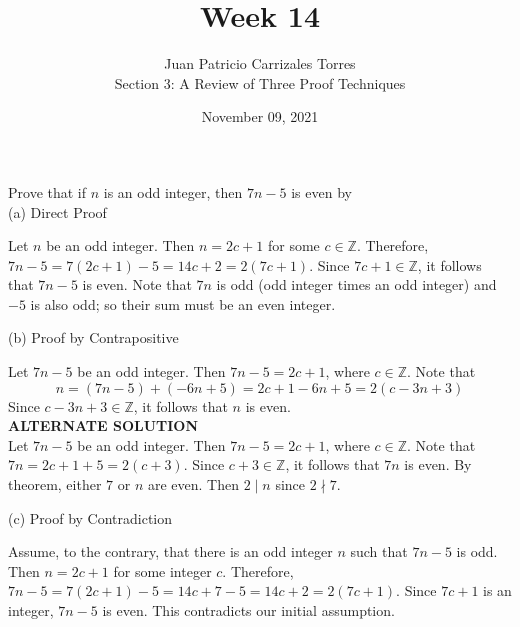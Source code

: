 \documentclass[12pt]{article}
\newcommand{\Z}{\mathbb{Z}}
\newenvironment{problem}[2][Problem]{\begin{trivlist}
		\item[\hskip \labelsep {\bfseries #1}\hskip \labelsep {\bfseries #2.}]}{\end{trivlist}}
\newenvironment{solution}[2][Solution]{\begin{trivlist}
		\item[\hskip \labelsep {\bfseries #1}\hskip \labelsep {\bfseries #2.}]}{\end{trivlist}}
\begin{document}
	
	\title{Week 14}
	\author{Juan Patricio Carrizales Torres \\
		Section 3: A Review of Three Proof Techniques}
	\date{November 09, 2021}
	\maketitle

	\begin{problem}{34}
		Prove that if $n$ is an odd integer, then $7n-5$ is even by\\
		
		(a) Direct Proof
		\begin{solution}{a}
			Let $n$ be an odd integer. Then $n=2c+1$ for some $c\in \Z$. Therefore, $7n -5 = 7(2c+1)-5 = 14c+2 = 2(7c+1)$. Since $7c+1 \in \Z$, it follows that $7n-5$ is even. Note that $7n$ is odd (odd integer times an odd integer) and $-5$ is also odd; so their sum must be an even integer.
		\end{solution}
	
		(b) Proof by Contrapositive
		\begin{solution}{b}
			Let $7n-5$ be an odd integer. Then $7n-5 = 2c +1$, where $c\in \Z$. Note that
			\begin{equation*}
				n = (7n-5) + (-6n+5) = 2c+1-6n+5 = 2(c-3n+3)
			\end{equation*}
		Since $c-3n+3 \in \Z$, it follows that $n$ is even.\\
		
		\textbf{ALTERNATE SOLUTION}\\
		
		Let $7n-5$ be an odd integer. Then $7n-5 = 2c+1$, where $c\in \Z$. Note that $7n = 2c+1+5 = 2(c+3)$. Since $c+3\in \Z$, it follows that $7n$ is even. By theorem, either $7$ or $n$ are even. Then $2\mid n$ since $2\nmid 7$.
		\end{solution}
	
		(c) Proof by Contradiction
		\begin{solution}{c}
			Assume, to the contrary, that there is an odd integer $n$ such that $7n-5$ is odd. Then $n=2c+1$ for some integer $c$. Therefore, $7n-5 = 7(2c+1)-5 = 14c+7-5 = 14c+2 = 2(7c+1)$. Since $7c+1$ is an integer, $7n-5$ is even. This contradicts our initial assumption. 
		\end{solution}
	\end{problem}
\end{document}
